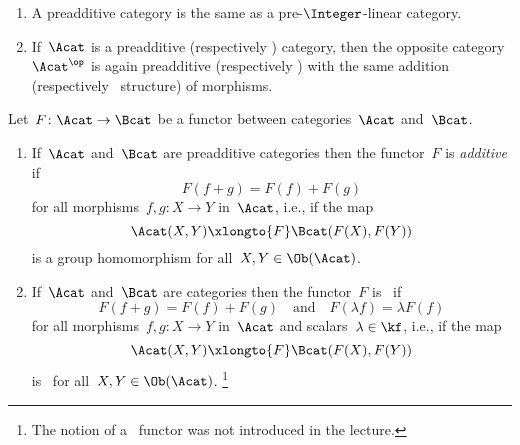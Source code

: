 \begin{remark*}
  \leavevmode
  \begin{enumerate}
    \item
      A preadditive category is the same as a pre\nobreakdash-$\Integer$\nobreakdash-linear category.
    \item
      If~$\Acat$ is a preadditive (respectively {\preklin}) category, then the opposite category~$\Acat^\op$ is again preadditive (respectively {\preklin}) with the same addition (respectively~{\module{$\kf$}} structure) of morphisms.
  \end{enumerate}
\end{remark*}


\begin{definition}
  Let~$F \colon \Acat \to \Bcat$ be a functor between categories~$\Acat$ and~$\Bcat$.
  \begin{enumerate}
    \item
      If~$\Acat$ and~$\Bcat$ are preadditive categories then the functor~$F$ is \emph{additive} if
      \[
          F(f + g)
        = F(f) + F(g)
      \]
      for all morphisms~$f, g \colon X \to Y$ in~$\Acat$, i.e., if the map
      \[
                    \Acat(X, Y)
        \xlongto{F} \Bcat(F(X), F(Y))
      \]
      is a group homomorphism for all~$X, Y \in \Ob(\Acat)$.
    \item
      If~$\Acat$ and~$\Bcat$ are {\preklin} categories then the functor~$F$ is~\emph{{\klin}} if
      \[
        F(f + g) = F(f) + F(g)
        \quad\text{and}\quad
        F(\lambda f) = \lambda F(f)
      \]
      for all morphisms~$f, g \colon X \to Y$ in~$\Acat$ and scalars~$\lambda \in \kf$, i.e., if the map
      \[
                    \Acat(X, Y)
        \xlongto{F} \Bcat(F(X), F(Y))
      \]
      is~{\klin} for all~$X, Y \in \Ob(\Acat)$.%
      \footnote{The notion of a~{\klin} functor was not introduced in the lecture.}
  \end{enumerate}
\end{definition}



